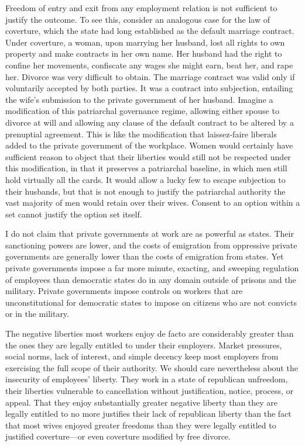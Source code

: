 \documentclass[
  letterpaper,
  11pt,
  DIV=9,
  openright]{scrbook}
\begin{document}
Freedom of entry and exit from any employment relation is not sufficient
to justify the outcome. To see this, consider an analogous case for the
law of coverture, which the state had long established as the default
marriage contract. Under coverture, a woman, upon marrying her husband,
lost all rights to own property and make contracts in her own name. Her
husband had the right to confine her movements, confiscate any wages she
might earn, beat her, and rape her. Divorce was very difficult to
obtain. The marriage contract was valid only if voluntarily accepted by
both parties. It was a contract into subjection, entailing the wife's
submission to the private government of her husband. Imagine a
modification of this patriarchal governance regime, allowing either
spouse to divorce at will and allowing any clause of the default
contract to be altered by a prenuptial agreement. This is like the
modification that laissez-faire liberals added to the private government
of the workplace. Women would certainly have sufficient reason to object
that their liberties would still not be respected under this
modification, in that it preserves a patriarchal baseline, in which men
still hold virtually all the cards. It would allow a lucky few to escape
subjection to their husbands, but that is not enough to justify the
patriarchal authority the vast majority of men would retain over their
wives. Consent to an option within a set cannot justify the option set
itself.

I do not claim that private governments at work are as powerful as
states. Their sanctioning powers are lower, and the costs of emigration
from oppressive private governments are generally lower than the costs
of emigration from states. Yet private governments impose a far more
minute, exacting, and sweeping regulation of employees than democratic
states do in any domain outside of prisons and the military. Private
governments impose controls on workers that are unconstitutional for
democratic states to impose on citizens who are not convicts or in the
military.

The negative liberties most workers enjoy de facto are considerably
greater than the ones they are legally entitled to under their
employers. Market pressures, social norms, lack of interest, and simple
decency keep most employers from exercising the full scope of their
authority. We should care nevertheless about the insecurity of
employees' liberty. They work in a state of republican unfreedom, their
liberties vulnerable to cancellation without justification, notice,
process, or appeal. That they enjoy substantially greater negative
liberty than they are legally entitled to no more justifies their lack
of republican liberty than the fact that most wives enjoyed greater
freedoms than they were legally entitled to justified coverture---or
even coverture modified by free divorce.
\end{document}
